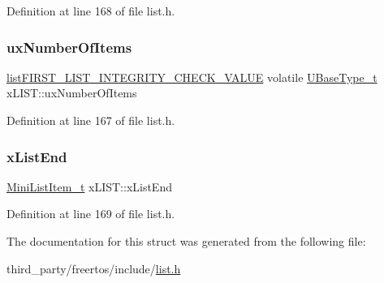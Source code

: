 Definition at line 168 of file list.\+h.

\mbox{\label{structxLIST_aa280e17bf4e71f81c449c2444cb70378}} 
\subsubsection{\texorpdfstring{ux\+Number\+Of\+Items}{uxNumberOfItems}}
{\footnotesize\ttfamily \hyperlink{list_8h_a3a52b5a4f70d3a07e37a5814a23ba880}{list\+F\+I\+R\+S\+T\+\_\+\+L\+I\+S\+T\+\_\+\+I\+N\+T\+E\+G\+R\+I\+T\+Y\+\_\+\+C\+H\+E\+C\+K\+\_\+\+V\+A\+L\+UE} volatile \hyperlink{pic32mx_2portmacro_8h_a646f89d4298e4f5afd522202b11cb2e6}{U\+Base\+Type\+\_\+t} x\+L\+I\+S\+T\+::ux\+Number\+Of\+Items}



Definition at line 167 of file list.\+h.

\mbox{\label{structxLIST_a49ad62fa153126e27e273811167b336a}} 
\subsubsection{\texorpdfstring{x\+List\+End}{xListEnd}}
{\footnotesize\ttfamily \hyperlink{list_8h_a542a8d55e98bc407593979e61f83cd02}{Mini\+List\+Item\+\_\+t} x\+L\+I\+S\+T\+::x\+List\+End}



Definition at line 169 of file list.\+h.



The documentation for this struct was generated from the following file\+:\begin{DoxyCompactItemize}
\item 
third\+\_\+party/freertos/include/\hyperlink{list_8h}{list.\+h}\end{DoxyCompactItemize}
